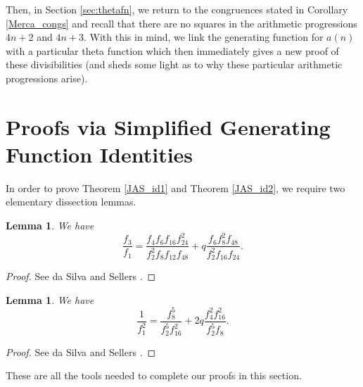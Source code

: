 \documentclass{amsart}
\newtheorem{lemma}[theorem]{Lemma}
\begin{document}
Then, in Section \ref{sec:thetafn}, we return to the congruences stated in Corollary \ref{Merca_congs} and recall that there are no squares in the arithmetic progressions $4n+2$ and $4n+3$.  With this in mind, we link the generating function for $a(n)$ with a particular theta function which then immediately gives a new proof of these divisibilities (and sheds some light as to why these particular arithmetic progressions arise).  

\section{Proofs via Simplified Generating Function Identities}
\label{sec:ids}

In order to prove Theorem \ref{JAS_id1} and Theorem \ref{JAS_id2}, we require two elementary dissection lemmas. 

\begin{lemma}
\label{lemma_f3overf1}
We have 
$$
\frac{f_3}{f_1} = \frac{f_4f_6f_{16}f_{24}^2}{f_2^2f_8f_{12}f_{48}} + q\frac{f_6f_8^2f_{48}}{f_2^2f_{16}f_{24}}.
$$
\end{lemma}

\begin{proof}
See da Silva and Sellers \cite[Lemma 1, (14)]{dSS}.  
\end{proof} 


\begin{lemma}
\label{lemma_1overf1squared}
We have 
$$
\frac{1}{f_1^2} = \frac{f_8^5}{f_2^5f_{16}^2} + 2q\frac{f_4^2f_{16}^2}{f_2^5f_8}.
$$
\end{lemma}

\begin{proof}
See da Silva and Sellers \cite[Lemma 1, (11)]{dSS}.  
\end{proof} 

These are all the tools needed to complete our proofs in this section.  
\end{document}
